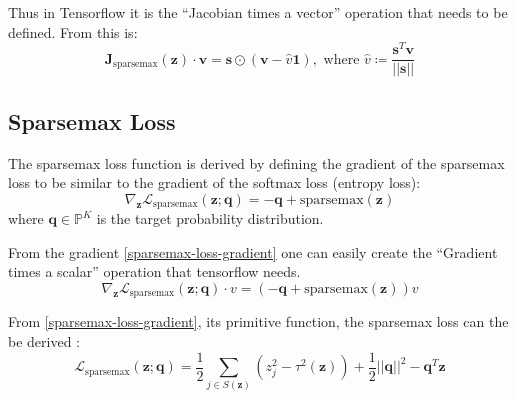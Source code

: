 Thus in Tensorflow it is the ``Jacobian times a vector'' operation that needs to be defined. From \cite{sparsemax} this is:
\begin{equation}
\mathbf{J}_{\mathrm{sparsemax}}(\mathbf{z}) \cdot \mathbf{v} = \mathbf{s} \odot (\mathbf{v} - \hat{v} \mathbf{1}), \text{  where } \hat{v} \coloneqq \frac{\mathbf{s}^T \mathbf{v}}{||\mathbf{s}||}
\end{equation}

\subsection{Sparsemax Loss}

The sparsemax loss function is derived by defining the gradient of the sparsemax loss to be similar to the gradient of the softmax loss (entropy loss):
\begin{equation}
\nabla_{\mathbf{z}} \mathcal{L}_{\mathrm{sparsemax}}(\mathbf{z}; \mathbf{q}) = -\mathbf{q} + \mathrm{sparsemax}(\mathbf{z})
\label{sparsemax-loss-gradient}
\end{equation}
where $\mathbf{q} \in \mathbb{P}^K$ is the target probability distribution.

From the gradient \eqref{sparsemax-loss-gradient} one can easily create the ``Gradient times a scalar'' operation that tensorflow needs.
\begin{equation}
\nabla_{\mathbf{z}} \mathcal{L}_{\mathrm{sparsemax}}(\mathbf{z}; \mathbf{q}) \cdot v = (-\mathbf{q} + \mathrm{sparsemax}(\mathbf{z})) v
\end{equation}

From \eqref{sparsemax-loss-gradient}, its primitive function, the sparsemax loss can the be derived \cite{sparsemax}:
\begin{equation}
\mathcal{L}_{\mathrm{sparsemax}}(\mathbf{z}; \mathbf{q}) = \frac{1}{2} \sum_{j \in S(\mathbf{z})} (z_j^2 - \tau^2(\mathbf{z})) + \frac{1}{2} ||\mathbf{q}||^2 - \mathbf{q}^T \mathbf{z}
\label{sparsemax-loss-original}
\end{equation}

